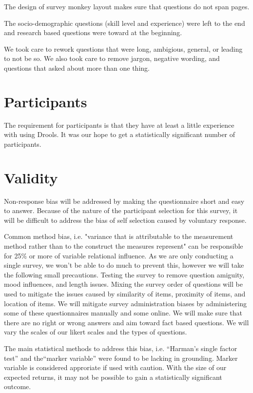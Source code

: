 The design of survey monkey layout makes sure that questions do not span pages.

The socio-demographic questions (skill level and experience) were left to the end and research based questions were toward at the beginning.

We took care to rework questions that were long, ambigious, general, or leading to not be so.
We also took care to remove jargon, negative wording, and questions that asked about more than one thing.

\section{Participants}

The requirement for participants is that they have at least a little experience with using Drools.
It was our hope to get a statistically significant number of participants.

\section{Validity}
Non-response bias\cite{armstrong1977estimating} will be addressed by making the questionnaire short and easy to answer.
Because of the nature of the participant selection for this survey, it will be difficult to address the bias of self selection caused by voluntary response.

Common method bias, i.e. "variance that is attributable to the measurement method rather than to the construct the measures represent"\cite{podsakoff2003common} can be responsible for 25\% or more of variable relational influence.
As we are only conducting a single survey, we won't be able to do much to prevent this, however we will take the following small precautions.
Testing the survey to remove question amiguity, mood influences, and length issues.
Mixing the survey order of questions will be used to mitigate the issues caused by similarity of items, proximity of items, and location of items.
We will mitigate survey administration biases by administering some of these questionnaires manually and some online.
We will make sure that there are no right or wrong answers and aim toward fact based questions.
We will vary the scales of our likert scales and the types of questions.

The main statistical methods to address this bias, i.e. ``Harman's single factor test''\cite{podsakoff2003common} and the``marker variable''\cite{lindell2001accounting} were found to be lacking in grounding\cite{gorrell2011countering}.
Marker variable is considered approriate if used with caution.
With the size of our expected returns, it may not be possible to gain a statistically significant outcome.

